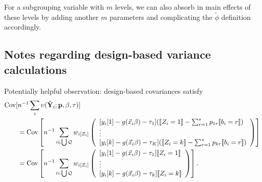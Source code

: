 \documentclass{article}
\DeclarePairedDelimiter{\indicator}{\llbracket}{\rrbracket}
\newcommand{\owt}[1][z_i]{\ensuremath{w_{i[#1]}}}
\begin{document}
For a subgrouping variable with $m$ levels,
we can also absorb in main effects of these levels by adding another
$m$ parameters and complicating the $\tilde{\phi}$ definition accordingly. 


\subsection{Notes regarding design-based variance calculations}

Potentially helpful observation:
design-based covariances satisfy
\begin{align*}
  \operatorname{Cov}[&n^{-1}\sum_{i}\upsilon(\tilde{\mathbf{Y}}_{i};
  \mathbf{p}, \beta, \tau)] \\
                     &=   \operatorname{Cov}\left[n^{-1}\sum_{i \in \bigcup \mathcal{Q}}
                       \owt[Z_{i}]
\left(
                                             \begin{array}{l}                                               
           [y_{i}[1]
                                               -
                                               g(\vec{x}_{i}\beta)-\tau_{1}](
                                               \indicator{Z_{i}=1} - \sum_{r=1}^{s}p_{1r}\indicator{b_{i}=r})\\
                  \vdots \\
{}           [y_{i}[k]
                                               - g(\vec{x}_{i}\beta) -
                                               \tau_{K}](\indicator{Z_{i}=k}
                                               - \sum_{r=1}^{s}p_{kr}\indicator{b_{i}=r})\\                                             \end{array}
\right) \right]\\
                     &=  \operatorname{Cov}\left[n^{-1}\sum_{i \in \bigcup \mathcal{Q}}
\owt[Z_{i}]
\left(
                                             \begin{array}{l}                                               
           [y_{i}[1]
                                               -
                                               g(\vec{x}_{i}\beta)-\tau_{1}]
                                               \indicator{Z_{i}=1}\\
                  \vdots \\
{}           [y_{i}[k]
                                               - g(\vec{x}_{i}\beta) -
                                               \tau_{k}]\indicator{Z_{i}=k}\\                                             \end{array}
\right)
\right].
\end{align*}
\end{document}
